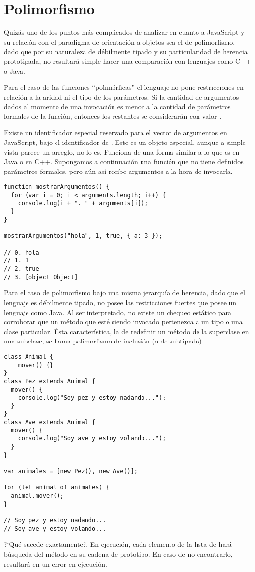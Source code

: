 
\section{Polimorfismo}

Quizás uno de los puntos más complicados de analizar en cuanto a JavaScript y su relación con el paradigma de orientación a objetos sea el de polimorfismo, dado que por su naturaleza de débilmente tipado y su particularidad de herencia prototipada, no resultará simple hacer una comparación con lenguajes como C++ o Java. 

Para el caso de las funciones "`polimórficas"' el lenguaje no pone restricciones en relación a la aridad ni el tipo de los parámetros. Si la cantidad de argumentos dados al momento de una invocación es menor a la cantidad de parámetros formales de la función, entonces los restantes se considerarán con valor . 

Existe un identificador especial reservado para el vector de argumentos en JavaScript, bajo el identificador de . Este es un objeto especial, aunque a simple vista parece un arreglo, no lo es. Funciona de una forma similar a lo que es  en Java o  en C++. Supongamos a continuación una función que no tiene definidos parámetros formales, pero aún así recibe argumentos a la hora de invocarla.

\begin{lstlisting}[title={Analizando \code{arguments}}]
function mostrarArgumentos() {
  for (var i = 0; i < arguments.length; i++) {
    console.log(i + ". " + arguments[i]);
  }
}

mostrarArgumentos("hola", 1, true, { a: 3 });

// 0. hola
// 1. 1
// 2. true
// 3. [object Object]
\end{lstlisting}

Para el caso de polimorfismo bajo una misma jerarquía de herencia, dado que el lenguaje es débilmente tipado, no posee las restricciones fuertes que posee un lenguaje como Java. Al ser interpretado, no existe un chequeo estático para corroborar que un método que esté siendo invocado pertenezca a un tipo o una clase particular. Ésta característica, la de redefinir un método de la superclase en una subclase, se llama polimorfismo de inclusión (o de subtipado).

\begin{lstlisting}
class Animal {
	mover() {}
}
class Pez extends Animal {
  mover() {
    console.log("Soy pez y estoy nadando...");
  }
}
class Ave extends Animal {
  mover() {
    console.log("Soy ave y estoy volando...");
  }
}

var animales = [new Pez(), new Ave()];

for (let animal of animales) {
  animal.mover();
}

// Soy pez y estoy nadando...
// Soy ave y estoy volando...
\end{lstlisting}

?`Qué sucede exactamente?. En ejecución, cada elemento de la lista de  hará búsqueda del método  en su cadena de prototipo. En caso de no encontrarlo, resultará en un error en ejecución. 
